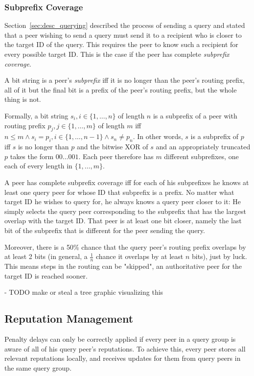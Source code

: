 \subsubsection{Subprefix Coverage}
Section~\ref{sec:desc_querying} described the process of sending a query and
stated that a peer wishing to send a query must send it to a recipient who is
closer to the target ID of the query. This requires the peer to know such a
recipient for every possible target ID. This is the case if the peer has
complete \emph{subprefix coverage}.

A bit string is a peer's \emph{subprefix} iff it is no longer than the peer's
routing prefix, all of it but the final bit is a prefix of the peer's routing
prefix, but the whole thing is not.

Formally, a bit string $s_i, i \in \{1, \ldots, n\}$ of length $n$ is a
subprefix of a peer with routing prefix $p_j, j \in \{1, \ldots, m\}$ of length
$m$ iff $n \leq m \land s_i = p_i, i \in \{1, \ldots, n - 1\} \land s_n \neq
p_n$. In other words, $s$ is a subprefix of $p$ iff $s$ is no longer than $p$
and the bitwise XOR of $s$ and an appropriately truncated $p$ takes the form
$00\ldots001$. Each peer therefore has $m$ different subprefixes, one each of
every length in $\{1, \ldots, m\}$.

A peer has complete subprefix coverage iff for each of his subprefixes he knows
at least one query peer for whose ID that subprefix is a prefix. No matter what
target ID he wishes to query for, he always knows a query peer closer to it: He
simply selects the query peer corresponding to the subprefix that has the
largest overlap with the target ID. That peer is at least one bit closer, namely
the last bit of the subprefix that is different for the peer sending the query.

Moreover, there is a 50\% chance that the query peer's routing prefix overlaps
by at least 2 bits (in general, a $\frac{1}{n}$ chance it overlaps by at least
$n$ bits), just by luck. This means steps in the routing can be "skipped", an
authoritative peer for the target ID is reached sooner.

- TODO make or steal a tree graphic visualizing this

\subsection{Reputation Management}
\label{sec:desc_rep_management}
Penalty delays can only be correctly applied if every peer in a query group is
aware of all of his query peer's reputations. To achieve this, every peer stores
all relevant reputations locally, and receives updates for them from query peers
in the same query group.

